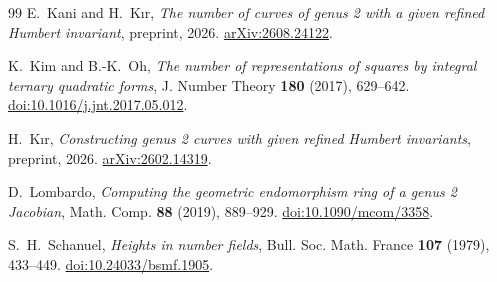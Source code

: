 \documentclass[11pt,letterpaper]{amsart}
\theoremstyle{definition}
\numberwithin{equation}{section}
\begin{document}
\begin{thebibliography}{99}
E.~Kani and H.~K\i r, \emph{The number of curves of genus 2 with a
given refined Humbert invariant}, preprint, 2026.
\href{https://arxiv.org/abs/2608.24122}{arXiv:2608.24122}.

K.~Kim and B.-K.~Oh, \emph{The number of representations of squares by
integral ternary quadratic forms}, J. Number Theory \textbf{180}
(2017), 629--642.
\href{https://doi.org/10.1016/j.jnt.2017.05.012}{doi:10.1016/j.jnt.2017.05.012}.

H.~K\i r, \emph{Constructing genus 2 curves with given refined Humbert
invariants}, preprint, 2026.
\href{https://arxiv.org/abs/2602.14319}{arXiv:2602.14319}.

D.~Lombardo, \emph{Computing the geometric endomorphism ring of a
genus 2 Jacobian}, Math. Comp. \textbf{88} (2019), 889--929.
\href{https://doi.org/10.1090/mcom/3358}{doi:10.1090/mcom/3358}.

S.~H.~Schanuel, \emph{Heights in number fields},
Bull. Soc. Math. France \textbf{107} (1979), 433--449.
\href{https://doi.org/10.24033/bsmf.1905}{doi:10.24033/bsmf.1905}.
\end{thebibliography}
\end{document}
